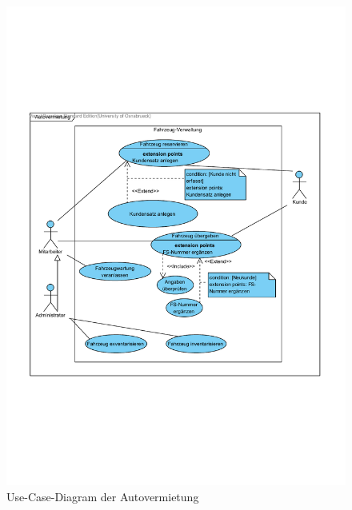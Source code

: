 \documentclass{scrartcl}
\begin{document}
\begin{figure}
   {\centering      
   \includegraphics[width=\linewidth]{Autovermietung.pdf}
   \caption{Use-Case-Diagram der Autovermietung}
   \label{autovermietung}}
\end{figure}
\end{document}

